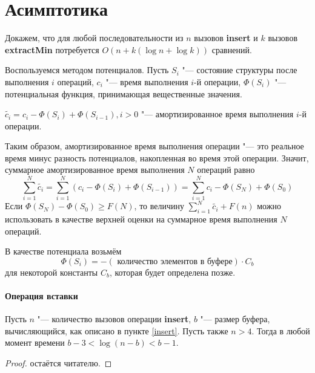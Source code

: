 \section{Асимптотика}
Докажем, что для любой последовательности из $n$ вызовов \textbf{insert}
и $k$ вызовов \textbf{extractMin} потребуется $O(n + k(\log n + \log k))$
сравнений.


Воспользуемся методом потенциалов. Пусть $S_i$ "--- состояние структуры
после выполнения $i$ операций, $c_i$ "--- время выполнения $i$-й операции,
$\Phi(S_i)$ "--- потенциальная функция, принимающая вещественные значения.

\begin{definition}
$\tilde{c_i} = c_i - \Phi(S_i) + \Phi(S_{i-1}), i > 0$ "--- амортизированное время
выполнения $i$-й операции.
\end{definition}
Таким образом, амортизированное время выполнения операции "--- это реальное время
минус разность потенциалов, накопленная во время этой операции. Значит, суммарное
амортизированное время выполнения $N$ операций равно
$$
\sum_{i=1}^N\tilde{c_i} = \sum_{i=1}^N(c_i - \Phi(S_i) + \Phi(S_{i-1})) =
\sum_{i=1}^Nc_i - \Phi(S_N) + \Phi(S_0)
$$
Если $\Phi(S_N) - \Phi(S_0) \geq F(N)$, то величину $\sum_{i=1}^N\tilde{c_i} + F(n)$
можно использовать в качестве верхней оценки на суммарное время выполнения $N$ операций.


В качестве потенциала возьмём 
$$\Phi(S_i)=-( \text{ количество элементов в буфере}) \cdot C_b$$
для некоторой константы
$C_b$, которая будет определена позже.

\paragraph{Операция вставки}

\begin{theorem} \label{BufferIsLargeEnough}
Пусть $n$ "--- количество вызовов операции \textbf{insert}, $b$ "--- размер
буфера, вычисляющийся, как описано в пункте \ref{insert}.
Пусть также $n > 4$. 
Тогда в любой момент времени $b - 3 < \log (n - b) < b - 1$.
\end{theorem}
\begin{proof}
остаётся читателю. 
\end{proof}

